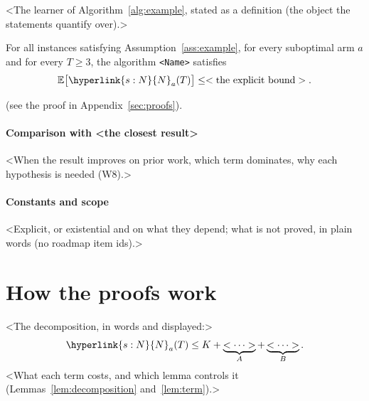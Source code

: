 \documentclass[11pt]{article}
\newcommand{\E}{\mathbb{E}}
\newcommand{\sy}[2]{\hyperlink{#1}{#2}}
\newcommand{\N}{\sy{s:N}{N}}
\begin{document}
\begin{definition}\label{def:algorithm}
<The learner of Algorithm~\ref{alg:example}, stated as a definition (the object the statements
quantify over).>
\end{definition}

\begin{theorem}\label{thm:main}
For all instances satisfying Assumption~\ref{ass:example}, for every suboptimal arm $a$ and for every
$T\ge3$, the algorithm \texttt{<Name>} satisfies
\begin{equation*}
  \E\big[\N_a(T)\big] \le <\text{the explicit bound}>.
\end{equation*}
\end{theorem}
(see the proof in Appendix~\ref{sec:proofs}).

\paragraph{Comparison with <the closest result>} <When the result improves on prior work, which term
dominates, why each hypothesis is needed (W8).>

\paragraph{Constants and scope} <Explicit, or existential and on what they depend; what is not
proved, in plain words (no roadmap item ids).>

\section{How the proofs work}\label{sec:overview}

<The decomposition, in words and displayed:>
\begin{equation*}
  \N_a(T) \le K + \underbrace{<\dots>}_{A} + \underbrace{<\dots>}_{B}.
\end{equation*}
<What each term costs, and which lemma controls it (Lemmas~\ref{lem:decomposition} and~\ref{lem:term}).>
\end{document}
